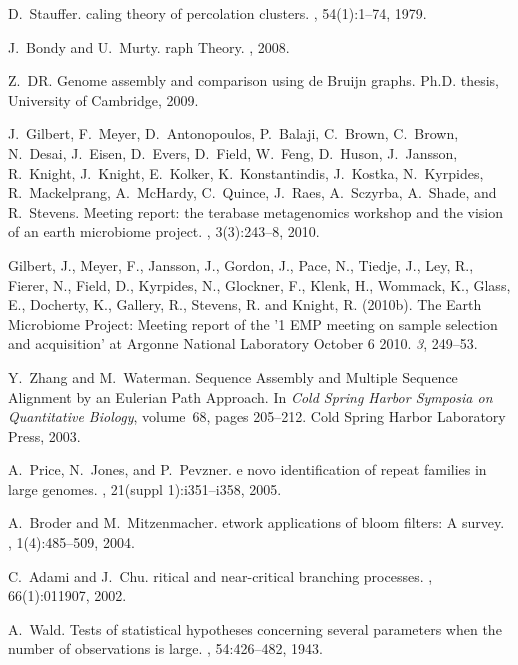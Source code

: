 \documentclass{pnastwo}
\begin{document}
\begin{article}
\begin{thebibliography}{10}
D.~Stauffer.
caling theory of percolation clusters.
, 54(1):1--74, 1979.

J.~Bondy and U.~Murty.
raph {T}heory.
, 2008.

Z.~DR.
\newblock Genome assembly and comparison using de {B}ruijn graphs.
\newblock Ph.D. thesis, University of Cambridge, 2009.

J.~Gilbert, F.~Meyer, D.~Antonopoulos, P.~Balaji, C.~Brown, C.~Brown, N.~Desai,
  J.~Eisen, D.~Evers, D.~Field, W.~Feng, D.~Huson, J.~Jansson, R.~Knight,
  J.~Knight, E.~Kolker, K.~Konstantindis, J.~Kostka, N.~Kyrpides,
  R.~Mackelprang, A.~McHardy, C.~Quince, J.~Raes, A.~Sczyrba, A.~Shade, and
  R.~Stevens.
\newblock Meeting report: the terabase metagenomics workshop and the vision of
  an earth microbiome project.
, 3(3):243--8, 2010.

Gilbert, J., Meyer, F., Jansson, J., Gordon, J., Pace, N., Tiedje, J., Ley, R.,
  Fierer, N., Field, D., Kyrpides, N., Glockner, F., Klenk, H., Wommack, K.,
  Glass, E., Docherty, K., Gallery, R., Stevens, R.  and Knight, R.
  (2010{\rm{b}}).
\newblock The Earth Microbiome Project: Meeting report of the '1 EMP meeting on
  sample selection and acquisition' at Argonne National Laboratory October 6
  2010.
 \emph{3}, 249--53.

Y.~Zhang and M.~Waterman.
 {S}equence {A}ssembly and {M}ultiple {S}equence {A}lignment
  by an {E}ulerian {P}ath {A}pproach.
\newblock In {\em Cold Spring Harbor Symposia on Quantitative Biology},
  volume~68, pages 205--212. Cold Spring Harbor Laboratory Press, 2003.

A.~Price, N.~Jones, and P.~Pevzner.
e novo identification of repeat families in large genomes.
, 21(suppl 1):i351--i358, 2005.

A.~Broder and M.~Mitzenmacher.
etwork applications of bloom filters: {A} survey.
, 1(4):485--509, 2004.

C.~Adami and J.~Chu.
ritical and near-critical branching processes.
, 66(1):011907, 2002.

A.~Wald.
\newblock Tests of statistical hypotheses concerning several parameters when
  the number of observations is large.
, 54:426--482,
  1943.

\end{thebibliography}

\end{article}
\end{document}
